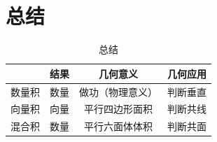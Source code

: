 \section{总结}
\begin{table}[H]
  \centering
  \caption{总结}
  \begin{tabular}{cccc}
    \toprule
           & 结果 & 几何意义         & 几何应用 \\
    \midrule
    数量积 & 数量 & 做功（物理意义） & 判断垂直 \\
    向量积 & 向量 & 平行四边形面积   & 判断共线 \\
    混合积 & 数量 & 平行六面体体积   & 判断共面 \\
    \bottomrule
  \end{tabular}
  \label{tab:summary}
\end{table}